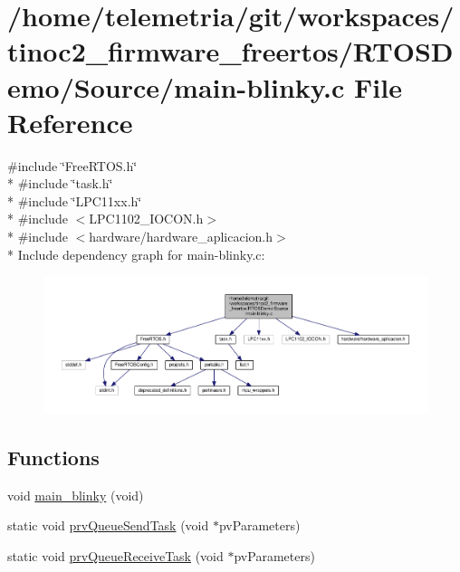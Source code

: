 \hypertarget{main-blinky_8c}{}\section{/home/telemetria/git/workspaces/tinoc2\+\_\+firmware\+\_\+freertos/\+R\+T\+O\+S\+Demo/\+Source/main-\/blinky.c File Reference}
\label{main-blinky_8c}
{\ttfamily \#include \char`\"{}Free\+R\+T\+O\+S.\+h\char`\"{}}\\*
{\ttfamily \#include \char`\"{}task.\+h\char`\"{}}\\*
{\ttfamily \#include \char`\"{}L\+P\+C11xx.\+h\char`\"{}}\\*
{\ttfamily \#include $<$L\+P\+C1102\+\_\+\+I\+O\+C\+O\+N.\+h$>$}\\*
{\ttfamily \#include $<$hardware/hardware\+\_\+aplicacion.\+h$>$}\\*
Include dependency graph for main-\/blinky.c\+:
\nopagebreak
\begin{figure}[H]
\begin{center}
\leavevmode
\includegraphics[width=350pt]{main-blinky_8c__incl}
\end{center}
\end{figure}
\subsection*{Functions}
\begin{DoxyCompactItemize}
\item 
void \hyperlink{main-blinky_8c_a65512bd13aab479a63a98ed356398c76}{main\+\_\+blinky} (void)
\item 
static void \hyperlink{main-blinky_8c_a819996a8cdb65ec32dc1592625e419aa}{prv\+Queue\+Send\+Task} (void $\ast$pv\+Parameters)
\item 
static void \hyperlink{main-blinky_8c_ae5f333e4cdf40958d9f0c4ce5efd85fc}{prv\+Queue\+Receive\+Task} (void $\ast$pv\+Parameters)
\end{DoxyCompactItemize}


